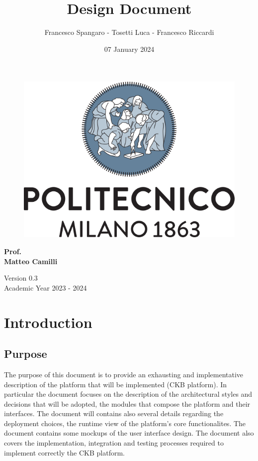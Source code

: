 \documentclass{article}
\title{\Huge{\textbf{Design Document}}}
\author{\Large{Francesco Spangaro - Tosetti Luca - Francesco Riccardi}}
\date{07 January 2024}
\begin{document}
\maketitle

\begin{figure}[h]
    \centering
    \includegraphics[scale=0.6]{politecnico-di-milano-logo.png}
\end{figure}

\vspace*{1cm}
\begin{center}
      \Large{\textbf{Prof.}} \\
      \Large{\textbf{Matteo Camilli}}
\end{center}
\vspace*{1cm}

\begin{center}
      \large{Version 0.3} \\
      \large{Academic Year 2023 - 2024}
\end{center}
\newpage
\tableofcontents


\pagestyle{IntroductionStyle}

\section{Introduction}
\subsection{Purpose}
The purpose of this document is to provide an exhausting and implementative
description of the platform that will be implemented (CKB platform).
In particular the document focuses on the description of the architectural styles and decisions
that will be adopted, the modules that compose the platform and their interfaces.
The document will contains also several details regarding the deployment choices,
the runtime view of the platform's core functionalites.
The document contains some mockups of the user interface design.
The document also covers the implementation, integration and testing
processes required to implement correctly the CKB platform.
\end{document}
